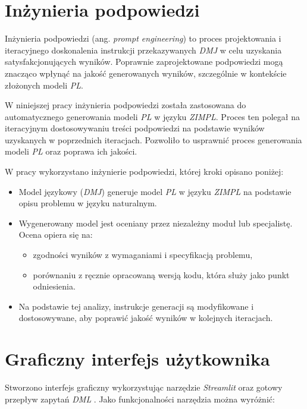\section{Inżynieria podpowiedzi}
Inżynieria podpowiedzi (ang. \textit{prompt engineering}) to proces projektowania i iteracyjnego doskonalenia instrukcji przekazywanych \textit{DMJ} w celu uzyskania satysfakcjonujących wyników. Poprawnie zaprojektowane podpowiedzi mogą znacząco wpłynąć na jakość generowanych wyników, szczególnie w kontekście złożonych modeli \textit{PL}.

W niniejszej pracy inżynieria podpowiedzi została zastosowana do automatycznego generowania modeli \textit{PL} w języku \textit{ZIMPL}. Proces ten polegał na iteracyjnym dostosowywaniu treści podpowiedzi na podstawie wyników uzyskanych w poprzednich iteracjach. Pozwoliło to usprawnić proces generowania modeli \textit{PL} oraz poprawa ich jakości.

W pracy wykorzystano inżynierie podpowiedzi, której kroki opisano poniżej:
\begin{itemize} 
\item Model językowy (\textit{DMJ}) generuje model \textit{PL} w języku \textit{ZIMPL} na podstawie opisu problemu w języku naturalnym. 
\item Wygenerowany model jest oceniany przez niezależny moduł lub specjalistę. Ocena opiera się na: 
    \begin{itemize} 
        \item zgodności wyników z wymaganiami i specyfikacją problemu, 
        \item porównaniu z ręcznie opracowaną wersją kodu, która służy jako punkt odniesienia. 
    \end{itemize} 
\item Na podstawie tej analizy, instrukcje generacji są modyfikowane i dostosowywane, aby poprawić jakość wyników w kolejnych iteracjach.\end{itemize}


\section{Graficzny interfejs użytkownika}\label{sec:generation:gui}

Stworzono interfejs graficzny wykorzystując narzędzie \textit{Streamlit} \cite{Streamlit2019} oraz gotowy przepływ zapytań \textit{DML} \cite{TODO}. Jako funkcjonalności narzędzia można wyróżnić:

